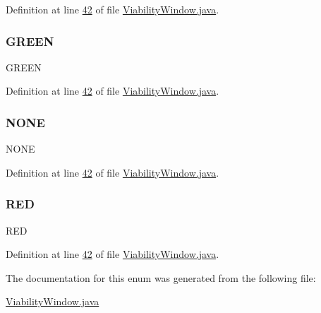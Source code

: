Definition at line \hyperlink{_viability_window_8java_source_l00042}{42} of file \hyperlink{_viability_window_8java_source}{Viability\+Window.\+java}.

\hypertarget{enumgui_1_1_viability_window_1_1_channel_ae64c262ce1094f21457d2f78dd45a8fc}{}\label{enumgui_1_1_viability_window_1_1_channel_ae64c262ce1094f21457d2f78dd45a8fc} 
\subsubsection{\texorpdfstring{G\+R\+E\+EN}{GREEN}}
{\footnotesize\ttfamily G\+R\+E\+EN}



Definition at line \hyperlink{_viability_window_8java_source_l00042}{42} of file \hyperlink{_viability_window_8java_source}{Viability\+Window.\+java}.

\hypertarget{enumgui_1_1_viability_window_1_1_channel_a899caa602e4fff675b17cdbab33607ec}{}\label{enumgui_1_1_viability_window_1_1_channel_a899caa602e4fff675b17cdbab33607ec} 
\subsubsection{\texorpdfstring{N\+O\+NE}{NONE}}
{\footnotesize\ttfamily N\+O\+NE}



Definition at line \hyperlink{_viability_window_8java_source_l00042}{42} of file \hyperlink{_viability_window_8java_source}{Viability\+Window.\+java}.

\hypertarget{enumgui_1_1_viability_window_1_1_channel_a2fa22bc5317cd6f6690f2528eaf84400}{}\label{enumgui_1_1_viability_window_1_1_channel_a2fa22bc5317cd6f6690f2528eaf84400} 
\subsubsection{\texorpdfstring{R\+ED}{RED}}
{\footnotesize\ttfamily R\+ED}



Definition at line \hyperlink{_viability_window_8java_source_l00042}{42} of file \hyperlink{_viability_window_8java_source}{Viability\+Window.\+java}.



The documentation for this enum was generated from the following file\+:\begin{DoxyCompactItemize}
\item 
\hyperlink{_viability_window_8java}{Viability\+Window.\+java}\end{DoxyCompactItemize}
